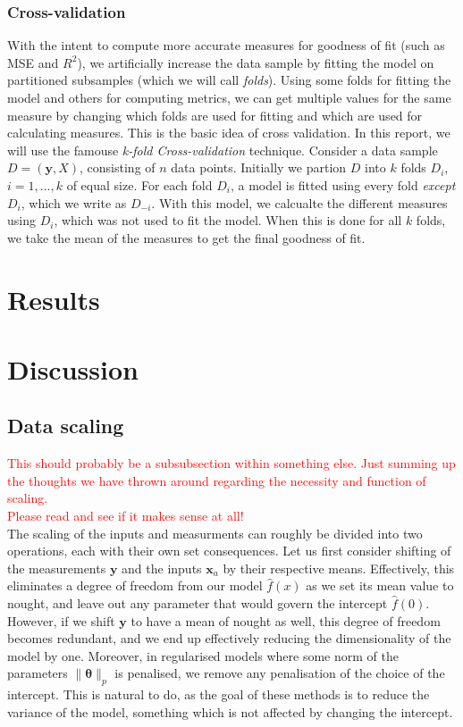 \documentclass[twocolumn,english,notitlepage]{article}
\newcommand{\comment}[1]{\textcolor{red}{#1}\\}
\renewcommand{\vec}[1]{\boldsymbol{#1}}
\renewcommand{\norm}[2][]{\ensuremath{\|#2\|_{#1}}}
\begin{document}
        \subsubsection*{Cross-validation}
        With the intent to compute more accurate measures for goodness of fit (such as MSE and $R^2$), we 
        artificially increase the data sample by fitting the model on partitioned subsamples (which we will call \textit{folds}). Using some folds
        for fitting the model and others for computing metrics, we can get multiple values for the same measure by changing which folds are used for fitting 
        and which are used for calculating measures. This is the basic idea of cross validation.
        \newline\newline
        In this report, we will use the famouse \textit{k-fold Cross-validation} technique. Consider a data sample $D = (\vec{y}, X)$, consisting of $n$ data points. Initially we partion $D$ into $k$ folds $D_i$, $i = 1, ... , k$ of equal size.   
        For each fold $D_i$, a model is fitted using every fold \textit{except} $D_i$, which we write as $D_{-i}$. With this model, we calcualte the different measures 
        using $D_i$, which was not used to fit the model. When this is done for all $k$ folds, we take the mean of the measures to get the 
        final goodness of fit. 


\section{Results}

\section{Discussion}
    \subsection{Data scaling}
        \comment{This should probably be a subsubsection within something else. Just summing up the thoughts we have thrown around regarding the necessity and function of scaling.}
        \comment{Please read and see if it makes sense at all!}
        The scaling of the inputs and measurments can roughly be divided into two operations, each with their own set consequences. Let us first consider shifting of the measurements $\vec{y}$ and the inputs $\vec{x}_a$ by their respective means. Effectively, this eliminates a degree of freedom from our model $\hat{f}(x)$ as we set its mean value to nought, and leave out any parameter that would govern the intercept $\hat{f}(0)$. However, if we shift $\vec{y}$ to have a mean of nought as well, this degree of freedom becomes redundant, and we end up effectively reducing the dimensionality of the model by one. Moreover, in regularised models where some norm of the parameters $\norm[p]{\vec{\theta}}$ is penalised, we remove any penalisation of the choice of the intercept. This is natural to do, as the goal of these methods is to reduce the variance of the model, something which is not affected by changing the intercept.
\end{document}
